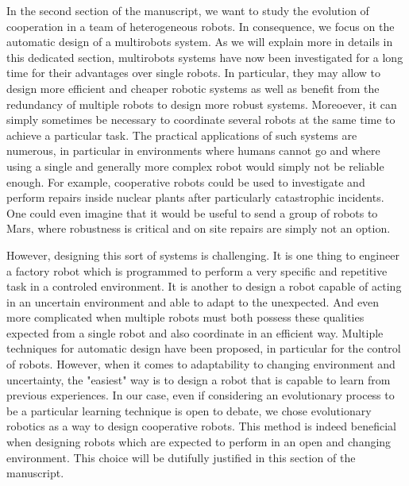     In the second section of the manuscript, we want to study the evolution of cooperation in a team of heterogeneous robots. In consequence, we focus on the automatic design of a multirobots system. As we will explain more in details in this dedicated section, multirobots systems have now been investigated for a long time for their advantages over single robots. In particular, they may allow to design more efficient and cheaper robotic systems as well as benefit from the redundancy of multiple robots to design more robust systems. Moreoever, it can simply sometimes be necessary to coordinate several robots at the same time to achieve a particular task. The practical applications of such systems are numerous, in particular in environments where humans cannot go and where using a single and generally more complex robot would simply not be reliable enough. For example, cooperative robots could be used to investigate and perform repairs inside nuclear plants after particularly catastrophic incidents. One could even imagine that it would be useful to send a group of robots to Mars, where robustness is critical and on site repairs are simply not an option.

    However, designing this sort of systems is challenging. It is one thing to engineer a factory robot which is programmed to perform a very specific and repetitive task in a controled environment. It is another to design a robot capable of acting in an uncertain environment and able to adapt to the unexpected. And even more complicated when multiple robots must both possess these qualities expected from a single robot and also coordinate in an efficient way. Multiple techniques for automatic design have been proposed, in particular for the control of robots. However, when it comes to adaptability to changing environment and uncertainty, the "easiest" way is to design a robot that is capable to learn from previous experiences. In our case, even if considering an evolutionary process to be a particular learning technique is open to debate, we chose evolutionary robotics as a way to design cooperative robots. This method is indeed beneficial when designing robots which are expected to perform in an open and changing environment. This choice will be dutifully justified in this section of the manuscript. 

